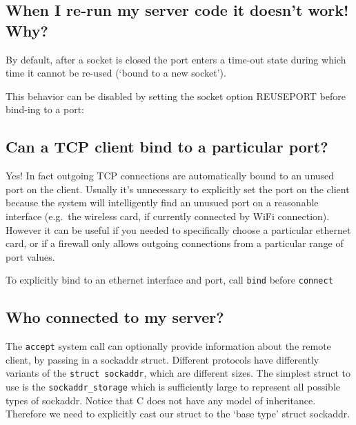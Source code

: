 \subsection{When I re-run my server code it doesn't work!
Why?}\label{when-i-re-run-my-server-code-it-doesnt-work-why}

By default, after a socket is closed the port enters a time-out state
during which time it cannot be re-used (`bound to a new socket').

This behavior can be disabled by setting the socket option REUSEPORT
before bind-ing to a port:

\begin{Shaded}
\begin{Highlighting}[]
     \NormalTok{;}

\end{Highlighting}
\end{Shaded}

\subsection{Can a TCP client bind to a particular
port?}\label{can-a-tcp-client-bind-to-a-particular-port}

Yes! In fact outgoing TCP connections are automatically bound to an
unused port on the client. Usually it's unnecessary to explicitly set
the port on the client because the system will intelligently find an
unusued port on a reasonable interface (e.g.~the wireless card, if
currently connected by WiFi connection). However it can be useful if you
needed to specifically choose a particular ethernet card, or if a
firewall only allows outgoing connections from a particular range of
port values.

To explicitly bind to an ethernet interface and port, call \texttt{bind}
before \texttt{connect}

\subsection{Who connected to my
server?}\label{who-connected-to-my-server}

The \texttt{accept} system call can optionally provide information about
the remote client, by passing in a sockaddr struct. Different protocols
have differently variants of the \texttt{struct\ sockaddr}, which are
different sizes. The simplest struct to use is the
\texttt{sockaddr\_storage} which is sufficiently large to represent all
possible types of sockaddr. Notice that C does not have any model of
inheritance. Therefore we need to explicitly cast our struct to the
`base type' struct sockaddr.

